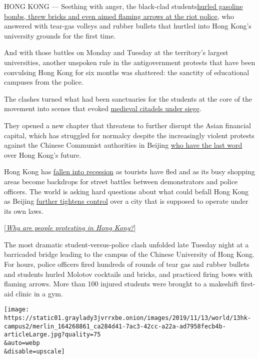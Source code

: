 HONG KONG --- Seething with anger, the black-clad
students\href{https://www.nytimes3xbfgragh.onion/2019/11/11/world/asia/hong-kong-protests-shooting.html}{hurled
gasoline bombs, threw bricks and even aimed flaming arrows at the riot
police,} who answered with tear-gas volleys and rubber bullets that
hurtled into Hong Kong's university grounds for the first time.

And with those battles on Monday and Tuesday at the territory's largest
universities, another unspoken rule in the antigovernment protests that
have been convulsing Hong Kong for six months was shattered: the
sanctity of educational campuses from the police.

The clashes turned what had been sanctuaries for the students at the
core of the movement into scenes that evoked
\href{https://www.nytimes3xbfgragh.onion/2019/11/12/world/asia/photos-hong-kong-protests.html}{medieval
citadels under siege}.

They opened a new chapter that threatens to further disrupt the Asian
financial capital, which has struggled for normalcy despite the
increasingly violent protests against the Chinese Communist authorities
in Beijing
\href{https://www.nytimes3xbfgragh.onion/2019/11/18/world/asia/hong-kong-protests.html}{who
have the last word} over Hong Kong's future.

Hong Kong has
\href{https://www.nytimes3xbfgragh.onion/2019/10/31/world/asia/hong-kong-halloween.html}{fallen
into recession} as tourists have fled and as its busy shopping areas
become backdrops for street battles between demonstrators and police
officers. The world is asking hard questions about what could befall
Hong Kong as Beijing
\href{https://www.nytimes3xbfgragh.onion/2019/09/06/business/hong-kong-fitch-downgrade.html}{further
tightens control} over a city that is supposed to operate under its own
laws.

{[}\href{https://www.nytimes3xbfgragh.onion/2019/11/13/world/asia/hong-kong-protests.html}{\emph{Why
are people protesting in Hong Kong?}}{]}

The most dramatic student-versus-police clash unfolded late Tuesday
night at a barricaded bridge leading to the campus of the Chinese
University of Hong Kong. For hours, police officers fired hundreds of
rounds of tear gas and rubber bullets and students hurled Molotov
cocktails and bricks, and practiced firing bows with flaming arrows.
More than 100 injured students were brought to a makeshift first-aid
clinic in a gym.

\texttt{[image: https://static01.graylady3jvrrxbe.onion/images/2019/11/13/world/13hk-campus2/merlin\_164268861\_ca284d41-7ac3-42cc-a22a-ad7958fecb4b-articleLarge.jpg?quality=75\\\&auto=webp\\\&disable=upscale]}

